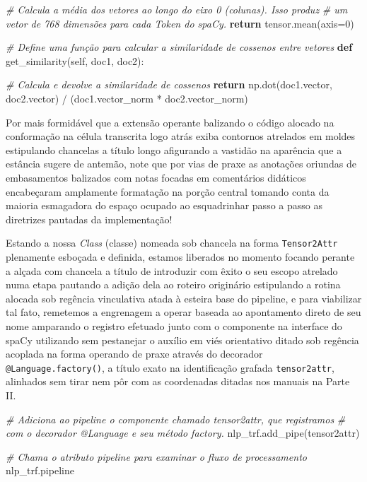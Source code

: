 \documentclass[
  brazilian,
]{article}
\newenvironment{Shaded}{}{}
\newcommand{\CommentTok}[1]{\textcolor[rgb]{0.38,0.63,0.69}{\textit{#1}}}
\newcommand{\ControlFlowTok}[1]{\textcolor[rgb]{0.00,0.44,0.13}{\textbf{#1}}}
\newcommand{\DecValTok}[1]{\textcolor[rgb]{0.25,0.63,0.44}{#1}}
\newcommand{\KeywordTok}[1]{\textcolor[rgb]{0.00,0.44,0.13}{\textbf{#1}}}
\newcommand{\NormalTok}[1]{#1}
\newcommand{\OperatorTok}[1]{\textcolor[rgb]{0.40,0.40,0.40}{#1}}
\newcommand{\StringTok}[1]{\textcolor[rgb]{0.25,0.44,0.63}{#1}}
\newcommand{\VariableTok}[1]{\textcolor[rgb]{0.10,0.09,0.49}{#1}}
\begin{document}
\begin{Shaded}
\begin{Highlighting}[]
        \CommentTok{\# Calcula a média dos vetores ao longo do eixo 0 (colunas). Isso produz}
        \CommentTok{\# um vetor de 768 dimensões para cada Token do spaCy.}
        \ControlFlowTok{return}\NormalTok{ tensor.mean(axis}\OperatorTok{=}\DecValTok{0}\NormalTok{)}
    
    \CommentTok{\# Define uma função para calcular a similaridade de cossenos entre vetores}
    \KeywordTok{def}\NormalTok{ get\_similarity(}\VariableTok{self}\NormalTok{, doc1, doc2):}
        
        \CommentTok{\# Calcula e devolve a similaridade de cossenos}
        \ControlFlowTok{return}\NormalTok{ np.dot(doc1.vector, doc2.vector) }\OperatorTok{/}\NormalTok{ (doc1.vector\_norm }\OperatorTok{*}\NormalTok{ doc2.vector\_norm)}
\end{Highlighting}
\end{Shaded}

Por mais formidável que a extensão operante balizando o código alocado
na conformação na célula transcrita logo atrás exiba contornos atrelados
em moldes estipulando chancelas a título longo afigurando a vastidão na
aparência que a estância sugere de antemão, note que por vias de praxe
as anotações oriundas de embasamentos balizados com notas focadas em
comentários didáticos encabeçaram amplamente formatação na porção
central tomando conta da maioria esmagadora do espaço ocupado ao
esquadrinhar passo a passo as diretrizes pautadas da implementação!

Estando a nossa \emph{Class} (classe) nomeada sob chancela na forma
\texttt{Tensor2Attr} plenamente esboçada e definida, estamos liberados
no momento focando perante a alçada com chancela a título de introduzir
com êxito o seu escopo atrelado numa etapa pautando a adição dela ao
roteiro originário estipulando a rotina alocada sob regência vinculativa
atada à esteira base do pipeline, e para viabilizar tal fato, remetemos
a engrenagem a operar baseada ao apontamento direto de seu nome
amparando o registro efetuado junto com o componente na interface do
spaCy utilizando sem pestanejar o auxílio em viés orientativo ditado sob
regência acoplada na forma operando de praxe através do decorador
\texttt{@Language.factory()}, a título exato na identificação grafada
\texttt{tensor2attr}, alinhados sem tirar nem pôr com as coordenadas
ditadas nos manuais na Parte II.

\begin{Shaded}
\begin{Highlighting}[]
\CommentTok{\# Adiciona ao pipeline o componente chamado \textquotesingle{}tensor2attr\textquotesingle{}, que registramos}
\CommentTok{\# com o decorador @Language e seu método \textquotesingle{}factory\textquotesingle{}.}
\NormalTok{nlp\_trf.add\_pipe(}\StringTok{\textquotesingle{}tensor2attr\textquotesingle{}}\NormalTok{)}

\CommentTok{\# Chama o atributo \textquotesingle{}pipeline\textquotesingle{} para examinar o fluxo de processamento}
\NormalTok{nlp\_trf.pipeline}
\end{Highlighting}
\end{Shaded}
\end{document}
